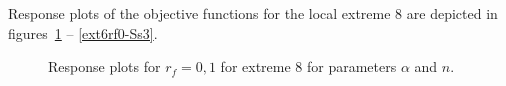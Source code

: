 \documentclass[review,times,3p,10pt]{elsarticle}
\begin{document}
Response plots of the objective functions for the local extreme 8 are depicted in figures~\ref{ext6rf0-an3} -- \ref{ext6rf0-Ss3}.

\begin{figure}[htb!]
\label{ext6rf0-an3}
\caption{Response plots for $r_f=0,1$ for extreme 8 for parameters $\alpha$ and $n$.}
\end{figure}
\end{document}
